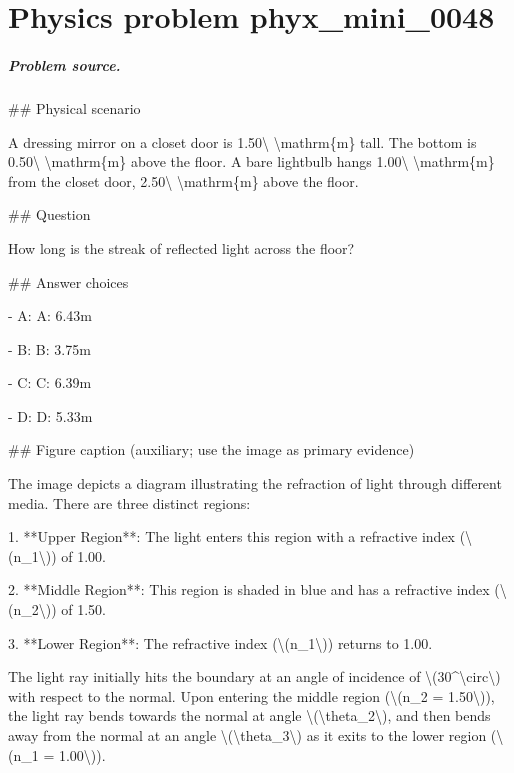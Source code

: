 
\chapter{Physics problem phyx\_mini\_0048}
\label{ch:PhyXMiniProblems_problem_phyx_mini_0048}

\paragraph{Problem source.}
\#\# Physical scenario

A dressing mirror on a closet door is 1.50\textbackslash{} \textbackslash{}mathrm\{m\} tall. The bottom is 0.50\textbackslash{} \textbackslash{}mathrm\{m\} above the floor. A bare lightbulb hangs 1.00\textbackslash{} \textbackslash{}mathrm\{m\} from the closet door, 2.50\textbackslash{} \textbackslash{}mathrm\{m\} above the floor.

\#\# Question

How long is the streak of reflected light across the floor?

\#\# Answer choices

- A: A: 6.43m

- B: B: 3.75m

- C: C: 6.39m

- D: D: 5.33m

\#\# Figure caption (auxiliary; use the image as primary evidence)

The image depicts a diagram illustrating the refraction of light through different media. There are three distinct regions:

1. **Upper Region**: The light enters this region with a refractive index (\textbackslash{}(n\_1\textbackslash{})) of 1.00.
   
2. **Middle Region**: This region is shaded in blue and has a refractive index (\textbackslash{}(n\_2\textbackslash{})) of 1.50. 

3. **Lower Region**: The refractive index (\textbackslash{}(n\_1\textbackslash{})) returns to 1.00.

The light ray initially hits the boundary at an angle of incidence of \textbackslash{}(30\textasciicircum{}\textbackslash{}circ\textbackslash{}) with respect to the normal. Upon entering the middle region (\textbackslash{}(n\_2 = 1.50\textbackslash{})), the light ray bends towards the normal at angle \textbackslash{}(\textbackslash{}theta\_2\textbackslash{}), and then bends away from the normal at an angle \textbackslash{}(\textbackslash{}theta\_3\textbackslash{}) as it exits to the lower region (\textbackslash{}(n\_1 = 1.00\textbackslash{})).

